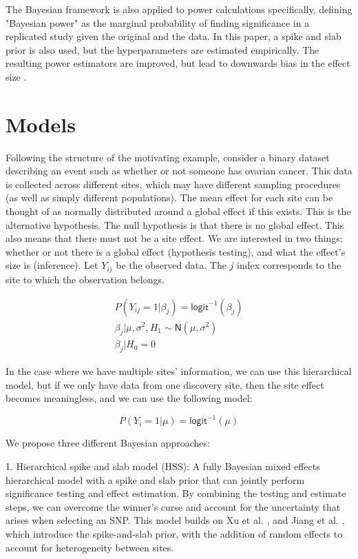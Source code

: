 \documentclass[AMA,STIX1COL]{WileyNJD-v2}\usepackage[]{graphicx}\usepackage[]{color}
\begin{document}
The Bayesian framework is also applied to power calculations specifically, defining "Bayesian power" as the marginal probability of finding significance in a replicated study given the original and the data. In this paper, a spike and slab prior is also used, but the hyperparameters are estimated empirically. The resulting power estimators are improved, but lead to downwards bias in the effect size \cite{jiang2016power}.

\section{Models}\label{sec:models}


Following the structure of the motivating example, consider a binary dataset describing an event such as whether or not someone has ovarian cancer. This data is collected across different sites, which may have different sampling procedures (as well as simply different populations). The mean effect for each site can be thought of as normally distributed around a global effect if this exists. This is the alternative hypothesis. The null hypothesis is that there is no global effect. This also means that there must not be a site effect. We are interested in two things: whether or not there is a global effect (hypothesis testing), and what the effect's size is (inference). Let $Y_{ij}$ be the observed data. The $j$ index corresponds to the site to which the observation belongs. 

\begin{gather}\label{eq1}
P(Y_{ij}=1| \beta_j) = \textsf{logit}^{-1}(\beta_{j})\\
\beta_{j}|\mu, \sigma^2,H_1 \sim \textsf{N}(\mu, \sigma^{2})\\
\beta_{j}|H_0 = 0
\end{gather}

In the case where we have multiple sites' information, we can use this hierarchical model, but if we only have data from one discovery site, then the site effect becomes meaningless, and we can use the following model:

\begin{equation}\label{eq2}
P(Y_{i}=1|\mu) = \textsf{logit}^{-1}(\mu)
\end{equation}

We propose three different Bayesian approaches: 

1. Hierarchical spike and slab model (HSS): A fully Bayesian mixed effects hierarchical model with a spike and slab prior that can jointly perform significance testing and effect estimation. By combining the testing and estimate steps, we can overcome the winner's curse and account for the uncertainty that arises when selecting an SNP. This model builds on Xu et al. \cite{xu2011bayesian}, and Jiang et al. \cite{jiang2016power}, which introduce the spike-and-slab prior, with the addition of random effects to account for heterogeneity between sites.
\end{document}
